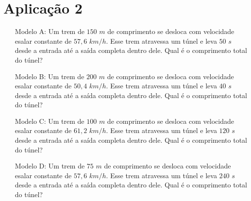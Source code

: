 \section{Aplicação 2}\label{ch:ASA1a2}
\begin{itemize}
    \item[Modelo A:] Um trem de $150$ $m$ de comprimento se desloca com velocidade esalar constante de $57,6$ $km/h$. Esse trem atravessa um túnel e leva $50$ $s$ desde a entrada até a saída completa dentro dele. Qual é o comprimento total do túnel?
    
    \item[Modelo B:] Um trem de $200$ $m$ de comprimento se desloca com velocidade esalar constante de $50,4$ $km/h$. Esse trem atravessa um túnel e leva $40$ $s$ desde a entrada até a saída completa dentro dele. Qual é o comprimento total do túnel?
    
    \item[Modelo C:] Um trem de $100$ $m$ de comprimento se desloca com velocidade esalar constante de $61,2$ $km/h$. Esse trem atravessa um túnel e leva $120$ $s$ desde a entrada até a saída completa dentro dele. Qual é o comprimento total do túnel?
    
    \item[Modelo D:] Um trem de $75$ $m$ de comprimento se desloca com velocidade esalar constante de $57,6$ $km/h$. Esse trem atravessa um túnel e leva $240$ $s$ desde a entrada até a saída completa dentro dele. Qual é o comprimento total do túnel?
\end{itemize}
\newpage
